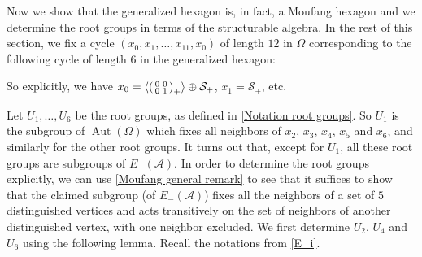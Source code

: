 \documentclass[oneside,a4paper]{amsart} %
\theoremstyle{definition}
\DeclareMathOperator{\Aut}{Aut}
\newcommand{\A}{\mathcal{A}}
\numberwithin{equation}{section}
\begin{document}
Now we show that the generalized hexagon is, in fact, a Moufang hexagon and we determine the root groups in terms of the structurable algebra.
In the rest of this section, we fix a cycle $(x_0,x_1,\dots,x_{11},x_0)$ of length $12$ in $\Omega$ corresponding to the following cycle of length $6$ in the generalized hexagon:



So explicitly, we have $x_0=\langle \begin{psmallmatrix} 0&0\\0&1 \end{psmallmatrix}_+\rangle\oplus \mathcal S_+$, $x_1=\mathcal S_+$, etc.

Let $U_1,\dots, U_6$ be the root groups, as defined in \cref{Notation root groups}.
So $U_1$ is the subgroup of $\Aut (\Omega)$ which fixes all neighbors of $x_2$, $x_3$, $x_4$, $x_5$ and $x_6$, and similarly for the other root groups.
It turns out that, except for $U_1$, all these root groups are subgroups of $E_-(\A)$.
In order to determine the root groups explicitly, we can use \cref{Moufang general remark} to see that it suffices to show that the claimed subgroup (of $E_-(\A)$) fixes all the neighbors of a set of $5$ distinguished vertices and acts transitively on the set of neighbors of another distinguished vertex, with one neighbor excluded. 
We first determine $U_2$, $U_4$ and $U_6$ using the following lemma.
Recall the notations from \cref{E_i}.
\end{document}
